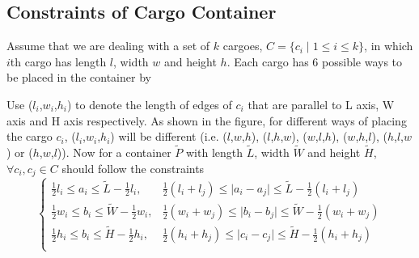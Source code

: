 \documentclass[12pt]{article}
\begin{document}
		\subsection{Constraints of Cargo Container}
			Assume that we are dealing with a set of $k$ cargoes, $C = \{c_i \mid 1 \leq i \leq k\}$, in which $i$th cargo has length $l$, width $w$ and height $h$. Each cargo has 6 possible ways to be placed in the container by
			\begin{figure}[H]
				\centering
			\end{figure}
			\par  
			Use ($l_i$,$w_i$,$h_i$) to denote the length of edges of $c_i$ that are parallel to L axis, W axis and H axis respectively. As shown in the figure, for different ways of placing the cargo $c_i$, ($l_i$,$w_i$,$h_i$) will be different (i.e. ($l$,$w$,$h$), ($l$,$h$,$w$), ($w$,$l$,$h$), ($w$,$h$,$l$), ($h$,$l$,$w$) or ($h$,$w$,$l$)). Now for a container $\tilde{P}$ with length $\tilde{L}$, width $\tilde{W}$ and height $\tilde{H}$, $\forall c_i, c_j \in C$ should follow the constraints
			\begin{equation}
				\left\{
					\begin{array}{lr}
						\frac{1}{2}l_i \leq a_i \leq \tilde{L} - \frac{1}{2}l_i, & \frac{1}{2}(l_i+l_j) \leq \mid a_i - a_j \mid \leq \tilde{L} - \frac{1}{2}(l_i+l_j)\\
						\frac{1}{2}w_i \leq b_i \leq \tilde{W} - \frac{1}{2}w_i, & \frac{1}{2}(w_i+w_j) \leq \mid b_i - b_j \mid \leq \tilde{W} - \frac{1}{2}(w_i+w_j)\\
						\frac{1}{2}h_i \leq b_i \leq \tilde{H} - \frac{1}{2}h_i, & \frac{1}{2}(h_i+h_j) \leq \mid c_i - c_j \mid \leq \tilde{H} - \frac{1}{2}(h_i+h_j)\\
					\end{array}
				\right.
			\end{equation}
\end{document}

